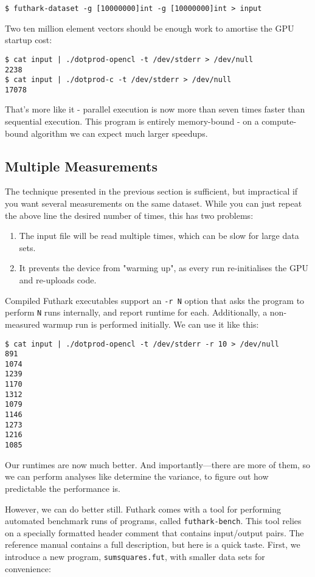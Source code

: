 \documentclass[oneside,11pt]{book}
\begin{document}
\begin{verbatim}
$ futhark-dataset -g [10000000]int -g [10000000]int > input
\end{verbatim}

Two ten million element vectors should be enough work to amortise the
GPU startup cost:

\begin{verbatim}
$ cat input | ./dotprod-opencl -t /dev/stderr > /dev/null
2238
$ cat input | ./dotprod-c -t /dev/stderr > /dev/null
17078
\end{verbatim}

That's more like it - parallel execution is now more than seven times
faster than sequential execution.  This program is entirely
memory-bound - on a compute-bound algorithm we can expect much larger
speedups.

\subsection{Multiple Measurements}

The technique presented in the previous section is sufficient, but
impractical if you want several measurements on the same dataset.
While you can just repeat the above line the desired number of times,
this has two problems:

\begin{enumerate}
\item The input file will be read multiple times, which can be slow
  for large data sets.
\item It prevents the device from "warming up", as every run
  re-initialises the GPU and re-uploads code.
\end{enumerate}

Compiled Futhark executables support an \texttt{-r N} option that asks
the program to perform \texttt{N} runs internally, and report runtime
for each.  Additionally, a non-measured warmup run is performed
initially.  We can use it like this:

\begin{verbatim}
$ cat input | ./dotprod-opencl -t /dev/stderr -r 10 > /dev/null
891
1074
1239
1170
1312
1079
1146
1273
1216
1085
\end{verbatim}

Our runtimes are now much better.  And importantly---there are
more of them, so we can perform analyses like determine the variance,
to figure out how predictable the performance is.

However, we can do better still.  Futhark comes with a tool for
performing automated benchmark runs of programs, called
\texttt{futhark-bench}.  This tool relies on a specially formatted
header comment that contains input/output pairs.  The reference manual
contains a full description, but here is a quick taste.  First, we
introduce a new program, \texttt{sumsquares.fut}, with smaller data
sets for convenience:
\end{document}
